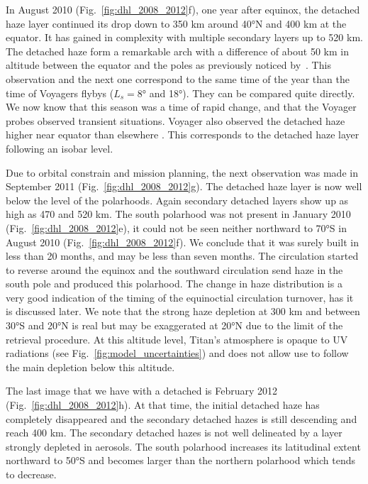 In August 2010 (Fig.~\ref{fig:dhl_2008_2012}f), one year after equinox, the detached haze layer continued
its drop down to 350 km around \ang{40}N and 400 km at the equator. It has gained in complexity with
multiple secondary layers up to 520 km. The detached haze form a remarkable arch with a difference of about 50 km
in altitude between the equator and the poles as previously noticed by~\cite{West2011}.
This observation and the next one correspond to the same time of the
year than the time of Voyagers flybys ($L_s=\ang{8}$ and \ang{18}). They can be compared quite directly. We now know
that this season was a time of rapid change, and that the Voyager probes observed transient situations. Voyager also
observed the detached haze higher near equator than elsewhere \citep{Rages1983, Rannou2000}. This corresponds to
the detached haze layer following an isobar level.

Due to orbital constrain and mission planning, the next observation was made in September 2011
(Fig.~\ref{fig:dhl_2008_2012}g). The detached haze layer is now well below the level of the polarhoods.
Again secondary detached layers show up as high as 470 and 520 km.
The south polarhood was not present in January 2010 (Fig.~\ref{fig:dhl_2008_2012}e), it could not be seen
neither northward to \ang{70}S in August 2010 (Fig.~\ref{fig:dhl_2008_2012}f). We conclude that it was surely
built in less than 20 months, and may be less than seven months. The circulation started to reverse around the equinox
and the southward circulation send haze in the south pole and produced this polarhood. The change in haze distribution
is a very good indication of the timing of the equinoctial circulation turnover, has it is discussed later. We note
that the strong haze depletion at 300 km and between \ang{30}S and \ang{20}N is real but may be exaggerated at \ang{20}N
due to the limit of the retrieval procedure. At this altitude level, Titan's atmosphere is opaque to UV radiations
(see Fig.~\ref{fig:model_uncertainties}) and does not allow use to follow the main depletion below this altitude.

The last image that we have with a detached is February 2012 (Fig.~\ref{fig:dhl_2008_2012}h). At that
time, the initial detached haze has completely disappeared and the secondary detached hazes is still descending
and reach 400 km. The secondary detached hazes is not well delineated by a layer strongly depleted in aerosols.
The south polarhood increases its latitudinal extent northward to \ang{50}S and becomes larger than the northern
polarhood which tends to decrease.
